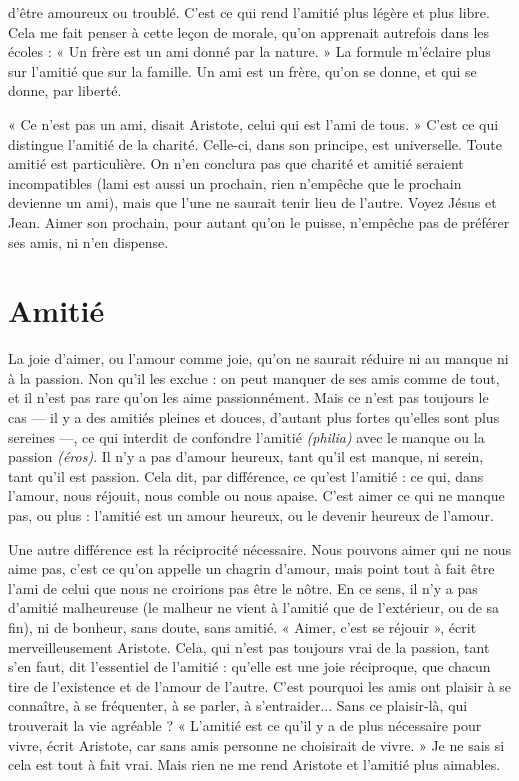 d’être amoureux ou troublé. C’est ce qui rend l'amitié plus légère et plus libre.
Cela me fait penser à cette leçon de morale, qu’on apprenait autrefois dans les
écoles : « Un frère est un ami donné par la nature. » La formule m’éclaire plus
sur l'amitié que sur la famille. Un ami est un frère, qu’on se donne, et qui se
donne, par liberté.

« Ce n’est pas un ami, disait Aristote, celui qui est l’ami de tous. » C’est ce
qui distingue l’amitié de la charité. Celle-ci, dans son principe, est universelle.
Toute amitié est particulière. On n’en conclura pas que charité et amitié
seraient incompatibles (lami est aussi un prochain, rien n’empêche que le prochain
devienne un ami), mais que l’une ne saurait tenir lieu de l’autre. Voyez
Jésus et Jean. Aimer son prochain, pour autant qu’on le puisse, n'empêche pas
de préférer ses amis, ni n’en dispense.

\section{Amitié}
La joie d’aimer, ou l’amour comme joie, qu’on ne saurait réduire ni
au manque ni à la passion. Non qu’il les exclue : on peut manquer
de ses amis comme de tout, et il n’est pas rare qu’on les aime passionnément.
Mais ce n’est pas toujours le cas — il y a des amitiés pleines et douces, d’autant
plus fortes qu’elles sont plus sereines —, ce qui interdit de confondre l’amitié
{\it (philia)} avec le manque ou la passion {\it (éros)}. Il n’y a pas d’amour heureux, tant
qu’il est manque, ni serein, tant qu’il est passion. Cela dit, par différence, ce
qu'est l’amitié : ce qui, dans l’amour, nous réjouit, nous comble ou nous
apaise. C’est aimer ce qui ne manque pas, ou plus : l'amitié est un amour heureux,
ou le devenir heureux de l'amour.

Une autre différence est la réciprocité nécessaire. Nous pouvons aimer qui
ne nous aime pas, c’est ce qu’on appelle un chagrin d’amour, mais point tout à
fait être l’ami de celui que nous ne croirions pas être le nôtre. En ce sens, il n’y
a pas d’amitié malheureuse (le malheur ne vient à l’amitié que de l'extérieur, ou
de sa fin), ni de bonheur, sans doute, sans amitié. « Aimer, c’est se réjouir »,
écrit merveilleusement Aristote. Cela, qui n’est pas toujours vrai de la passion,
tant s’en faut, dit l'essentiel de l'amitié : qu’elle est une joie réciproque, que
chacun tire de l’existence et de l’amour de l’autre. C’est pourquoi les amis ont
plaisir à se connaître, à se fréquenter, à se parler, à s’entraider... Sans ce plaisir-là,
qui trouverait la vie agréable ? « L'amitié est ce qu’il y a de plus nécessaire
pour vivre, écrit Aristote, car sans amis personne ne choisirait de vivre. » Je ne
sais si cela est tout à fait vrai. Mais rien ne me rend Aristote et l'amitié plus
aimables.

